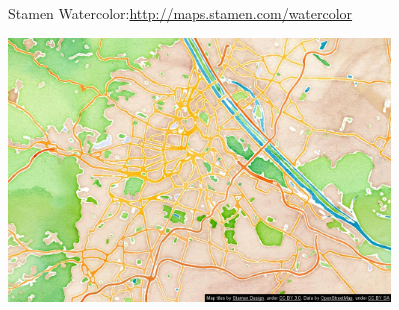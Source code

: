 \documentclass{beamer}
\begin{document}
\begin{frame}{Stamen Watercolor:\hfill\href{http://maps.stamen.com/watercolor/}{http://maps.stamen.com/watercolor}}
\begin{center}
\includegraphics[height=7cm]{style-stamen.png}
\end{center}
\end{frame}
\hypersetup{urlcolor=blue}

\end{document}
